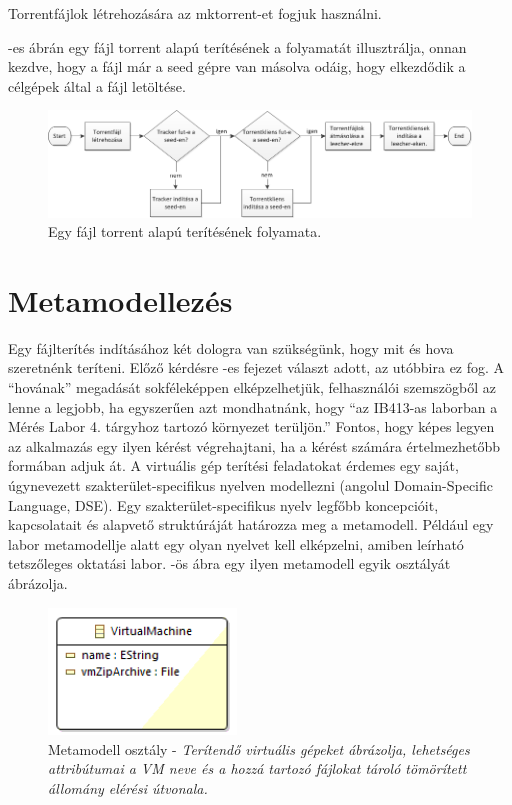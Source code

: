 Torrentfájlok létrehozására az mktorrent-et\cite{mktorrent} fogjuk használni.

-es ábrán egy fájl torrent alapú terítésének a folyamatát illusztrálja, onnan kezdve, hogy a fájl már a seed gépre van másolva odáig, hogy elkezdődik a célgépek által a fájl letöltése.

\begin{figure}[ht]
	\centering
	\includegraphics[width=150mm, keepaspectratio]{figures/torrentflow.png}
	\caption{Egy fájl torrent alapú terítésének folyamata.}
	\label{fig:torrentflow}
\end{figure}


\section{Metamodellezés}
Egy fájlterítés indításához két dologra van szükségünk, hogy mit és hova szeretnénk teríteni. Előző kérdésre -es fejezet választ adott, az utóbbira ez fog. A ``hovának'' megadását sokféleképpen elképzelhetjük,  felhasználói szemszögből az lenne a legjobb, ha egyszerűen azt mondhatnánk, hogy ``az IB413-as laborban a Mérés Labor 4. tárgyhoz tartozó környezet terüljön.'' Fontos, hogy képes legyen az alkalmazás egy ilyen kérést végrehajtani, ha a kérést számára értelmezhetőbb formában adjuk át. 
A virtuális gép terítési feladatokat érdemes egy saját, úgynevezett szakterület-specifikus nyelven modellezni (angolul Domain-Specific Language, DSE). Egy szakterület-specifikus nyelv legfőbb koncepcióit, kapcsolatait és alapvető struktúráját határozza meg a metamodell. Például egy labor metamodellje alatt egy olyan nyelvet kell elképzelni, amiben leírható tetszőleges oktatási labor. -ös ábra egy ilyen metamodell egyik osztályát ábrázolja.

\begin{figure}[ht]
	\centering
	\includegraphics[width=50mm, keepaspectratio]{figures/binf_emf_1.png}
	\caption{Metamodell osztály - \textit{Terítendő virtuális gépeket ábrázolja, lehetséges attribútumai a VM neve és a hozzá tartozó fájlokat tároló tömörített állomány elérési útvonala.}}
	\label{fig:emfobj}
\end{figure}

